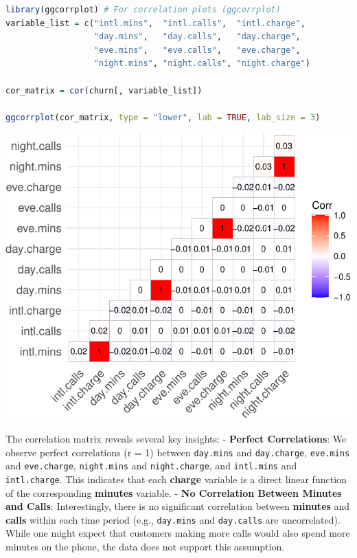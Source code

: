 \documentclass[
]{book}
\newcommand{\passthrough}[1]{#1}
\theoremstyle{definition}
\theoremstyle{definition}
\theoremstyle{definition}
\theoremstyle{definition}
\theoremstyle{remark}
\begin{document}
\begin{lstlisting}[language=R]
library(ggcorrplot) # For correlation plots (ggcorrplot)
variable_list = c("intl.mins",  "intl.calls",  "intl.charge", 
                  "day.mins",   "day.calls",   "day.charge",
                  "eve.mins",   "eve.calls",   "eve.charge",
                  "night.mins", "night.calls", "night.charge")

cor_matrix = cor(churn[, variable_list])

ggcorrplot(cor_matrix, type = "lower", lab = TRUE, lab_size = 3)
\end{lstlisting}

\begin{center}\includegraphics{EDA_files/figure-latex/unnamed-chunk-18-1} \end{center}

The correlation matrix reveals several key insights:
- \textbf{Perfect Correlations}: We observe perfect correlations (r = 1) between \passthrough{\lstinline!day.mins!} and \passthrough{\lstinline!day.charge!}, \passthrough{\lstinline!eve.mins!} and \passthrough{\lstinline!eve.charge!}, \passthrough{\lstinline!night.mins!} and \passthrough{\lstinline!night.charge!}, and \passthrough{\lstinline!intl.mins!} and \passthrough{\lstinline!intl.charge!}. This indicates that each \textbf{charge} variable is a direct linear function of the corresponding \textbf{minutes} variable.
- \textbf{No Correlation Between Minutes and Calls}: Interestingly, there is no significant correlation between \textbf{minutes} and \textbf{calls} within each time period (e.g., \passthrough{\lstinline!day.mins!} and \passthrough{\lstinline!day.calls!} are uncorrelated). While one might expect that customers making more calls would also spend more minutes on the phone, the data does not support this assumption.
\end{document}

